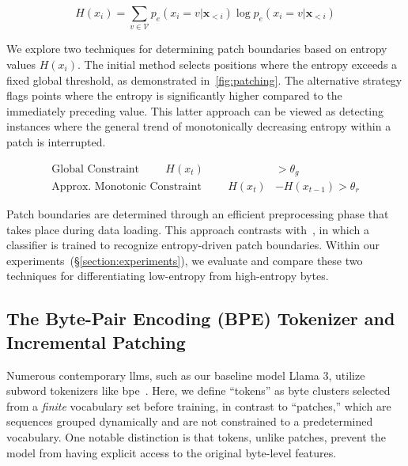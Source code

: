 \begin{equation}
H(x_i) = \sum_{v \in \mathcal{V}} p_{e}(x_i=v|\pmb{x}_{<i}) \log p_{e}(x_i=v|\pmb{x}_{<i})
\end{equation}

We explore two techniques for determining patch boundaries based on entropy values $H(x_i)$. The initial method selects positions where the entropy exceeds a fixed global threshold, as demonstrated in~\autoref{fig:patching}. The alternative strategy flags points where the entropy is significantly higher compared to the immediately preceding value. This latter approach can be viewed as detecting instances where the general trend of monotonically decreasing entropy within a patch is interrupted.

\begin{align*}
    \text{Global Constraint}\hspace{1cm}H(x_t)& > \theta_g\\
    \text{Approx. Monotonic Constraint}\hspace{1cm}H(x_t)& - H(x_{t-1}) > \theta_r
\end{align*}

Patch boundaries are determined through an efficient preprocessing phase that takes place during data loading. This approach contrasts with~\citet{nawrot-etal-2023-efficient}, in which a classifier is trained to recognize entropy-driven patch boundaries. Within our experiments~(\S\ref{section:experiments}), we evaluate and compare these two techniques for differentiating low-entropy from high-entropy bytes.

\subsection{The Byte-Pair Encoding (BPE) Tokenizer and Incremental Patching}
\label{section:incremental-patching}
\label{section:bpe-patch}

Numerous contemporary llms, such as our baseline model Llama 3, utilize subword tokenizers like bpe~\citep{gage1994new, sennrich-etal-2016-neural}. Here, we define ``tokens'' as byte clusters selected from a \textit{finite} vocabulary set before training, in contrast to ``patches,'' which are sequences grouped dynamically and are not constrained to a predetermined vocabulary. One notable distinction is that tokens, unlike patches, prevent the model from having explicit access to the original byte-level features.

